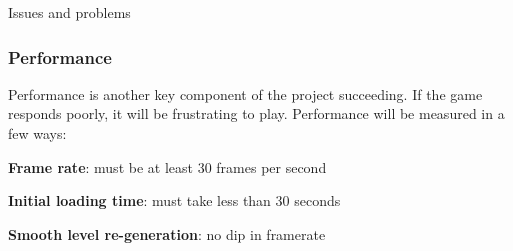 \documentclass[progress]{cmpreport}
\begin{document}
\begin{section}{Issues and problems}
\subsubsection{Performance}
Performance is another key component of the project succeeding. If the game responds poorly, it will be frustrating to play. Performance will be measured in a few ways:
\newline
\begin{compactitem}
    \item{\textbf{Frame rate}: must be at least 30 frames per second}
    \item{\textbf{Initial loading time}: must take less than 30 seconds}
    \item{\textbf{Smooth level re-generation}: no dip in framerate}
\end{compactitem}



\end{section}
\end{document}
